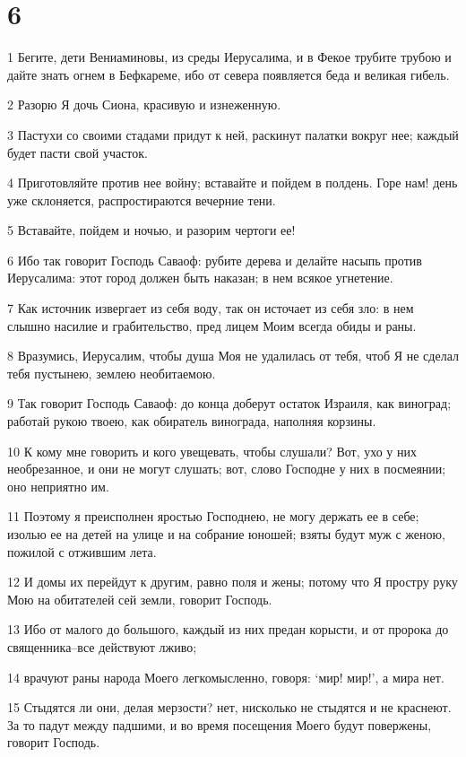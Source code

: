 \chapter{6}

\par 1 Бегите, дети Вениаминовы, из среды Иерусалима, и в Фекое трубите трубою и дайте знать огнем в Бефкареме, ибо от севера появляется беда и великая гибель.
\par 2 Разорю Я дочь Сиона, красивую и изнеженную.
\par 3 Пастухи со своими стадами придут к ней, раскинут палатки вокруг нее; каждый будет пасти свой участок.
\par 4 Приготовляйте против нее войну; вставайте и пойдем в полдень. Горе нам! день уже склоняется, распростираются вечерние тени.
\par 5 Вставайте, пойдем и ночью, и разорим чертоги ее!
\par 6 Ибо так говорит Господь Саваоф: рубите дерева и делайте насыпь против Иерусалима: этот город должен быть наказан; в нем всякое угнетение.
\par 7 Как источник извергает из себя воду, так он источает из себя зло: в нем слышно насилие и грабительство, пред лицем Моим всегда обиды и раны.
\par 8 Вразумись, Иерусалим, чтобы душа Моя не удалилась от тебя, чтоб Я не сделал тебя пустынею, землею необитаемою.
\par 9 Так говорит Господь Саваоф: до конца доберут остаток Израиля, как виноград; работай рукою твоею, как обиратель винограда, наполняя корзины.
\par 10 К кому мне говорить и кого увещевать, чтобы слушали? Вот, ухо у них необрезанное, и они не могут слушать; вот, слово Господне у них в посмеянии; оно неприятно им.
\par 11 Поэтому я преисполнен яростью Господнею, не могу держать ее в себе; изолью ее на детей на улице и на собрание юношей; взяты будут муж с женою, пожилой с отжившим лета.
\par 12 И домы их перейдут к другим, равно поля и жены; потому что Я простру руку Мою на обитателей сей земли, говорит Господь.
\par 13 Ибо от малого до большого, каждый из них предан корысти, и от пророка до священника--все действуют лживо;
\par 14 врачуют раны народа Моего легкомысленно, говоря: `мир! мир!', а мира нет.
\par 15 Стыдятся ли они, делая мерзости? нет, нисколько не стыдятся и не краснеют. За то падут между падшими, и во время посещения Моего будут повержены, говорит Господь.
